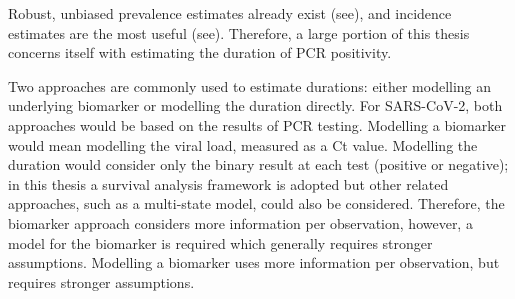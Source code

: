 \documentclass[thesis.tex]{subfiles}
\begin{document}
Robust, unbiased prevalence estimates already exist (see), and incidence estimates are the most useful (see).
Therefore, a large portion of this thesis concerns itself with estimating the duration of PCR positivity.

Two approaches are commonly used to estimate durations: either modelling an underlying biomarker or modelling the duration directly.
For SARS-CoV-2, both approaches would be based on the results of PCR testing.
Modelling a biomarker would mean modelling the viral load, measured as a Ct value.
Modelling the duration would consider only the binary result at each test (positive or negative); in this thesis a survival analysis framework is adopted but other related approaches, such as a multi-state model, could also be considered.
Therefore, the biomarker approach considers more information per observation, however, a model for the biomarker is required which generally requires stronger assumptions.
Modelling a biomarker uses more information per observation, but requires stronger assumptions.
\end{document}
